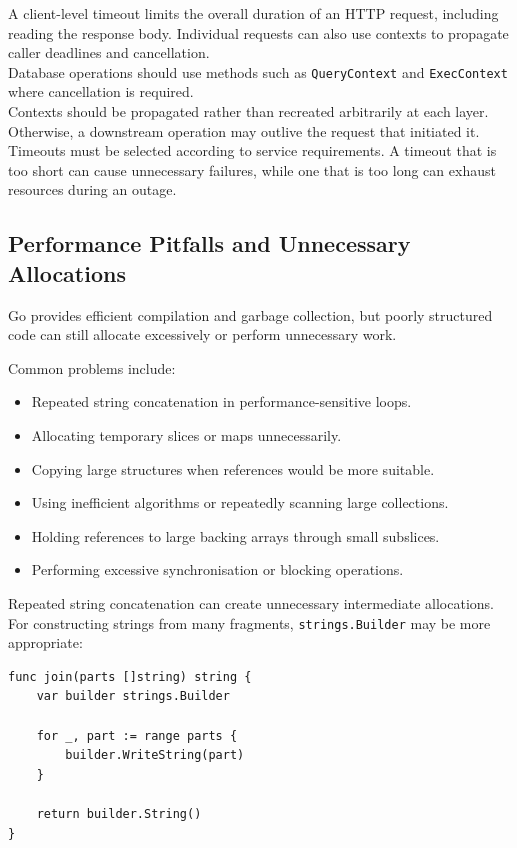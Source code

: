 A client-level timeout limits the overall duration of an HTTP request, including reading the response body. Individual requests can also use contexts to propagate caller deadlines and cancellation.\\

Database operations should use methods such as \texttt{QueryContext} and \texttt{ExecContext} where cancellation is required.\\

Contexts should be propagated rather than recreated arbitrarily at each layer. Otherwise, a downstream operation may outlive the request that initiated it.\\

Timeouts must be selected according to service requirements. A timeout that is too short can cause unnecessary failures, while one that is too long can exhaust resources during an outage.\\

\subsection{Performance Pitfalls and Unnecessary Allocations}

Go provides efficient compilation and garbage collection, but poorly structured code can still allocate excessively or perform unnecessary work.

Common problems include:

\begin{itemize}
    \item Repeated string concatenation in performance-sensitive loops.
    \item Allocating temporary slices or maps unnecessarily.
    \item Copying large structures when references would be more suitable.
    \item Using inefficient algorithms or repeatedly scanning large collections.
    \item Holding references to large backing arrays through small subslices.
    \item Performing excessive synchronisation or blocking operations.
\end{itemize}

Repeated string concatenation can create unnecessary intermediate allocations. For constructing strings from many fragments, \texttt{strings.Builder} may be more appropriate:

\begin{lstlisting}
func join(parts []string) string {
    var builder strings.Builder

    for _, part := range parts {
        builder.WriteString(part)
    }

    return builder.String()
}
\end{lstlisting}

